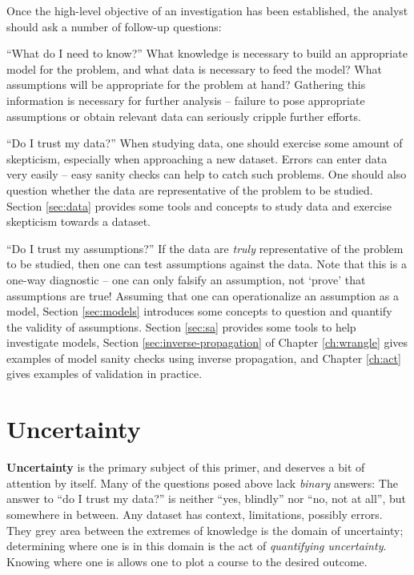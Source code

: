 \documentclass[../primer.tex]{subfiles}
\begin{document}
Once the high-level objective of an investigation has been established, the
analyst should ask a number of follow-up questions:

``What do I need to know?'' What knowledge is necessary to build an appropriate
model for the problem, and what data is necessary to feed the model? What
assumptions will be appropriate for the problem at hand? Gathering this
information is necessary for further analysis -- failure to pose appropriate
assumptions or obtain relevant data can seriously cripple further efforts.

``Do I trust my data?'' When studying data, one should exercise some amount of
skepticism, especially when approaching a new dataset. Errors can enter data
very easily -- easy sanity checks can help to catch such problems. One should
also question whether the data are representative of the problem to be studied.
Section \ref{sec:data} provides some tools and concepts to study data and
exercise skepticism towards a dataset.

``Do I trust my assumptions?'' If the data are \emph{truly} representative of
the problem to be studied, then one can test assumptions against the data. Note
that this is a one-way diagnostic -- one can only falsify an assumption, not
`prove' that assumptions are true! Assuming that one can operationalize an
assumption as a model, Section \ref{sec:models} introduces some concepts to
question and quantify the validity of assumptions. Section \ref{sec:sa} provides
some tools to help investigate models, Section \ref{sec:inverse-propagation} of
Chapter \ref{ch:wrangle} gives examples of model sanity checks using inverse
propagation, and Chapter \ref{ch:act} gives examples of validation in practice.

\section{Uncertainty} \label{sec:uncertainty}
\textbf{Uncertainty} is the primary subject of this primer, and deserves a bit
of attention by itself. Many of the questions posed above lack \emph{binary}
answers: The answer to ``do I trust my data?'' is neither ``yes, blindly'' nor
``no, not at all'', but somewhere in between. Any dataset has context,
limitations, possibly errors. They grey area between the extremes of knowledge
is the domain of uncertainty; determining where one is in this domain is the act
of \emph{quantifying uncertainty}. Knowing where one is allows one to plot a
course to the desired outcome.
\end{document}
